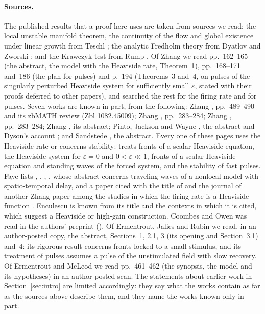\documentclass[11pt]{article}
\theoremstyle{definition}
\newcommand{\eps}{\varepsilon}
\begin{document}
\paragraph{Sources.} The published results that a proof here uses are taken from sources we read: the local unstable manifold theorem, the continuity of the flow and global existence under linear growth from Teschl \cite[Theorems~9.4, 9.5, 6.1 and~2.17]{teschl2012}; the analytic Fredholm theory from Dyatlov and Zworski \cite[Appendix~C, Theorems~C.5, C.8 and~C.9]{dz2019}; and the Krawczyk test from Rump \cite[Theorem~13.3]{rump2010}. Of Zhang \cite{zhang2004} we read pp.~162--165 (the abstract, the model with the Heaviside rate, Theorem~1), pp.~168--171 and~186 (the plan for pulses) and p.~194 (Theorems~3 and~4, on pulses of the singularly perturbed Heaviside system for sufficiently small $\eps$, stated with their proofs deferred to other papers), and searched the rest for the firing rate and for pulses. Seven works are known in part, from the following: Zhang \cite{zhang2005}, pp.~489--490 and its zbMATH review (Zbl 1082.45009); Zhang \cite{zhang2007}, pp.~283--284; Zhang \cite{zhang2004acta}, pp.~283--284; Zhang \cite{zhang2007siads}, its abstract; Pinto, Jackson and Wayne \cite{pjw2005}, the abstract and Dyson's account \cite[pp.~7--8]{dyson2025}; and Sandstede \cite{sandstede2007}, the abstract. Every one of these pages uses the Heaviside rate or concerns stability: \cite{zhang2004} treats fronts of a scalar Heaviside equation, \cite{zhang2005} the Heaviside system for $\eps = 0$ and $0 < \eps \ll 1$, \cite{zhang2007} fronts of a scalar Heaviside equation and standing waves of the forced system, and \cite{zhang2004acta} the stability of fast pulses. Faye lists \cite{zhang2005}, \cite{pjw2005}, \cite{sandstede2007}, \cite{zhang2007siads}, whose abstract concerns traveling waves of a nonlocal model with spatio-temporal delay, and a paper cited with the title of \cite{zhang2004} and the journal of another Zhang paper among the studies in which the firing rate is a Heaviside function \cite[p.~2 and references~33, 35 and~42--44]{faye2013}. Enculescu \cite{enculescu2004} is known from its title and the contexts in which it is cited, which suggest a Heaviside or high-gain construction. Coombes and Owen \cite{co2004} was read in the authors' preprint (). Of Ermentrout, Jalics and Rubin \cite{ejr2010} we read, in an author-posted copy, the abstract, Sections~1, 2.1, 3 (its opening and Section~3.1) and~4: its rigorous result concerns fronts locked to a small stimulus, and its treatment of pulses assumes a pulse of the unstimulated field with slow recovery. Of Ermentrout and McLeod \cite{em1993} we read pp.~461--462 (the synopsis, the model and its hypotheses) in an author-posted scan. The statements about earlier work in Section~\ref{sec:intro} are limited accordingly: they say what the works contain as far as the sources above describe them, and they name the works known only in part.
\end{document}
